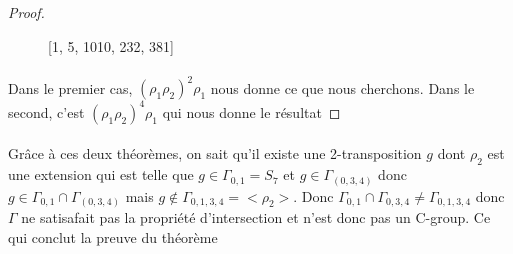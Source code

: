 \begin{proof}
\begin{figure}[H]
\begin{center}
      \caption{[1, 5, 1010, 232, 381]}
    \end{center}
  \end{figure}

  \paragraph{}
  Dans le premier cas, $(\rho_1\rho_2)^2\rho_1$ nous donne ce que nous cherchons. Dans le second, c'est $(\rho_1\rho_2)^4\rho_1$ qui nous donne le résultat

\end{proof}

\paragraph{}
Grâce à ces deux théorèmes, on sait qu'il existe une 2-transposition $g$ dont $\rho_2$ est une extension qui est telle que $ g \in \Gamma_{0,1} = S_7$ et $g \in \Gamma_(0,3,4)$ donc $g \in \Gamma_{0,1} \cap \Gamma_(0,3,4)$ mais $g \notin \Gamma_{0,1,3,4} = <\rho_2>$. Donc $\Gamma_{0,1} \cap \Gamma_{0,3,4} \neq \Gamma_{0,1,3,4}$ donc $\Gamma$ ne satisafait pas la propriété d'intersection et n'est donc pas un C-group. Ce qui conclut la preuve du théorème

